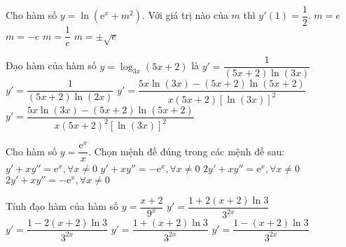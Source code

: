 \begin{ex}%
	Cho hàm số $y=\ln \left(\mathrm{e}^x+m^2\right)$. Với giá trị nào của $m$ thì $y'(1)=\dfrac{1}{2}$. 
	\choice
	{$m=e$}
	{$m=-e$}
	{$m=\dfrac{1}{e}$}
	{\True $m=\pm\sqrt{e}$}
\end{ex}
\begin{ex}%
	Đạo hàm của hàm số $y=\log_{3x}(5x+2)$ là
	\choice
	{$y'=\dfrac{1}{(5x+2)\ln (3x)}$}
	{$y'=\dfrac{1}{(5x+2)\ln (2x)}$}
	{\True $y'=\dfrac{5x\ln (3x)-(5x+2)\ln (5x+2)}{x(5x+2)[\ln (3x)]^2}$}
	{$y'=\dfrac{5x\ln (3x)-(5x+2)\ln (5x+2)}{x(5x+2)^2[\ln (3x)]^2}$}
\end{ex}
\begin{ex}%
	Cho hàm số $y=\dfrac{\mathrm{e}^x}{x}$. Chọn mệnh đề đúng trong các mệnh đề sau: 
	\choice
	{$y'+xy''=\mathrm{e}^x,\forall x\neq 0$}
	{$y'+xy''=-\mathrm{e}^x,\forall x\neq 0$}
	{\True $2y'+xy''=\mathrm{e}^x,\forall x\neq 0$}
	{$2y'+xy''=-\mathrm{e}^x,\forall x\neq 0$}
\end{ex}
\begin{ex}%
	Tính đạo hàm của hàm số $y=\dfrac{x+2}{9^x}$ 
	\choice
	{$y'=\dfrac{1+2(x+2)\ln 3}{3^{2x}}$}
	{\True $y'=\dfrac{1-2(x+2)\ln 3}{3^{2x}}$}
	{$y'=\dfrac{1+(x+2)\ln 3}{3^{2x}}$}
	{$y'=\dfrac{1-(x+2)\ln 3}{3^{2x}}$}
\end{ex}
